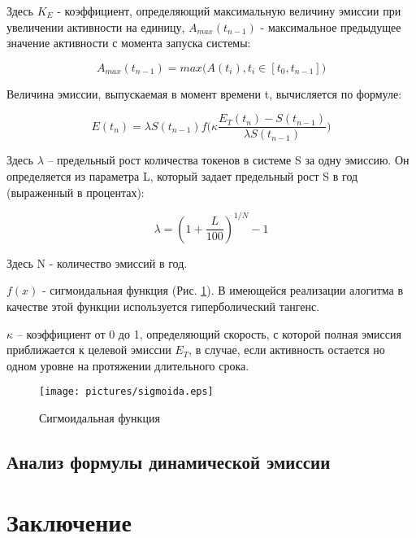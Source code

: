 \documentclass[a4paper,12pt]{article}
\begin{document}
Здесь $K_E$ - коэффициент, определяющий максимальную величину эмиссии при увеличении активности на единицу, $A_{max}(t_{n-1})$ - максимальное предыдущее значение активности с момента запуска системы:

$$
    A_{max}(t_{n-1}) = max \Big ( A(t_i), t_i \in [t_0, t_{n-1}] \Big )
$$

Величина эмиссии, выпускаемая в момент времени t, вычисляется по формуле:

$$
    E(t_n) = \lambda S(t_{n-1}) f \Big( \kappa \frac {E_T(t_n) - S(t_{n-1})}{\lambda S(t_{n-1})} \Big)
$$

Здесь $\lambda$ -- предельный рост количества токенов в системе S за одну эмиссию. Он определяется из параметра L, который задает предельный рост S в год (выраженный в процентах):

$$
    \lambda = (1 + \frac{L}{100})^{1/N}-1
$$

Здесь N - количество эмиссий в год.

$f(x)$ - сигмоидальная функция (Рис. \ref{fig:sigmoida}). В имеющейся реализации алогитма в качестве этой функции используется гиперболический тангенс.

$\kappa$ -- коэффициент от 0 до 1, определяющий скорость, с которой полная эмиссия приближается к целевой эмиссии $E_T$, в случае, если активность остается но одном уровне на протяжении длительного срока.

\begin{figure}[h]
      \texttt{[image: pictures/sigmoida.eps]}
      \caption{Сигмоидальная функция}
      \label{fig:sigmoida}
\end{figure}

\subsection{Анализ формулы динамической эмиссии}






\section{Заключение}
\end{document}
